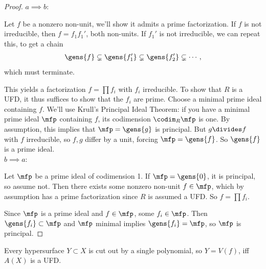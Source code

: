 \begin{proof}

\(a\implies b\):

Let \(f\) be a nonzero non-unit, we'll show it admits a prime
factorization. If \(f\) is not irreducible, then \(f = f_1 f_1'\), both
non-units. If \(f_1'\) is not irreducible, we can repeat this, to get a
chain
\begin{align*}  
\gens{f} \subsetneq \gens{f_1'} \subsetneq \gens{f_2'} \subsetneq \cdots
,\end{align*} which must terminate.

This yields a factorization \(f = \prod f_i\) with \(f_i\) irreducible.
To show that \(R\) is a UFD, it thus suffices to show that the \(f_i\)
are prime. Choose a minimal prime ideal containing \(f\). We'll use
Krull's Principal Ideal Theorem: if you have a minimal prime ideal
\(\mfp\) containing \(f\), its codimension \(\codim_R \mfp\) is one. By
assumption, this implies that \(\mfp = \gens{g}\) is principal. But
\(g\divides f\) with \(f\) irreducible, so \(f,g\) differ by a unit,
forcing \(\mfp = \gens{f}\). So \(\gens{f}\) is a prime ideal.\\

\(b\implies a\):

Let \(\mfp\) be a prime ideal of codimension 1. If \(\mfp = \gens{0}\),
it is principal, so assume not. Then there exists some nonzero non-unit
\(f\in \mfp\), which by assumption has a prime factorization since \(R\)
is assumed a UFD. So \(f=\prod f_i\).

Since \(\mfp\) is a prime ideal and \(f\in\mfp\), some \(f_i\in \mfp\).
Then \(\gens{f_i} \subset \mfp\) and \(\mfp\) minimal implies
\(\gens{f_i} = \mfp\), so \(\mfp\) is principal.

\end{proof}

\begin{corollary}[?]

Every hypersurface \(Y\subset X\) is cut out by a single polynomial, so
\(Y=V(f)\), iff \(A(X)\) is a UFD.

\end{corollary}

